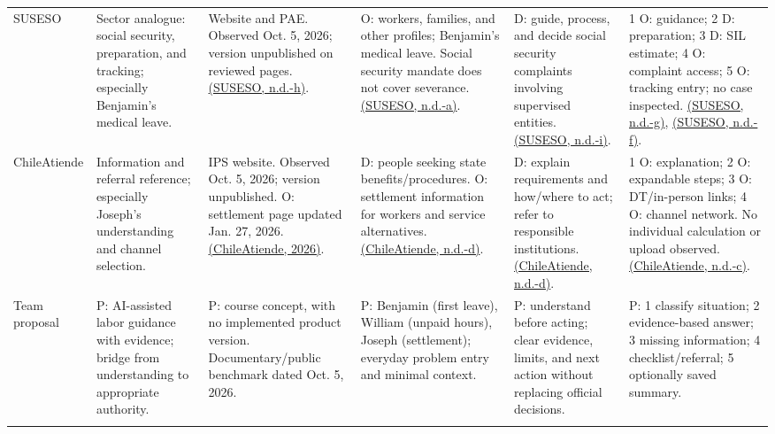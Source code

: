 \begin{landscape}
\begin{singlespace}
\begin{xltabular}{\linewidth}{@{}p{1.02in}YYYYY@{}}
SUSESO & Sector analogue: social security, preparation, and tracking; especially Benjamin's medical leave. & Website and PAE. Observed Oct. 5, 2026; version unpublished on reviewed pages. \hyperref[ref:su_usuarios]{(SUSESO, n.d.-h)}. & O: workers, families, and other profiles; Benjamin's medical leave. Social security mandate does not cover severance. \hyperref[ref:su_orientador]{(SUSESO, n.d.-a)}. & D: guide, process, and decide social security complaints involving supervised entities. \hyperref[ref:su_competencia]{(SUSESO, n.d.-i)}. & 1 O: guidance; 2 D: preparation; 3 D: SIL estimate; 4 O: complaint access; 5 O: tracking entry; no case inspected. \hyperref[ref:su_ciclo]{(SUSESO, n.d.-g)}, \hyperref[ref:su_simulador]{(SUSESO, n.d.-f)}.\\\addlinespace[3pt]

ChileAtiende & Information and referral reference; especially Joseph's understanding and channel selection. & IPS website. Observed Oct. 5, 2026; version unpublished. O: settlement page updated Jan. 27, 2026. \hyperref[ref:ca_finiquito]{(ChileAtiende, 2026)}. & D: people seeking state benefits/procedures. O: settlement information for workers and service alternatives. \hyperref[ref:ca_descripcion]{(ChileAtiende, n.d.-d)}. & D: explain requirements and how/where to act; refer to responsible institutions. \hyperref[ref:ca_descripcion]{(ChileAtiende, n.d.-d)}. & 1 O: explanation; 2 O: expandable steps; 3 O: DT/in-person links; 4 O: channel network. No individual calculation or upload observed. \hyperref[ref:ca_red]{(ChileAtiende, n.d.-c)}.\\\addlinespace[3pt]

Team proposal & P: AI-assisted labor guidance with evidence; bridge from understanding to appropriate authority. & P: course concept, with no implemented product version. Documentary/public benchmark dated Oct. 5, 2026. & P: Benjamin (first leave), William (unpaid hours), Joseph (settlement); everyday problem entry and minimal context. & P: understand before acting; clear evidence, limits, and next action without replacing official decisions. & P: 1 classify situation; 2 evidence-based answer; 3 missing information; 4 checklist/referral; 5 optionally saved summary.\\\addlinespace[3pt]

\end{xltabular}\end{singlespace}\end{landscape}

